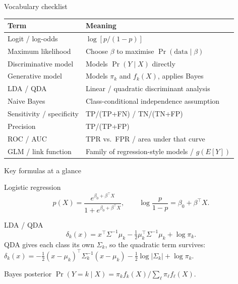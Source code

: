 \documentclass[aspectratio=169,11pt]{beamer}
\begin{document}
\begin{frame}{Vocabulary checklist}
  \footnotesize
  \begin{tabular}{ll}
    \toprule
    \textbf{Term} & \textbf{Meaning} \\
    \midrule
    Logit / log-odds & $\log[p / (1 - p)]$ \\
    Maximum likelihood & Choose $\beta$ to maximise $\Pr(\mathrm{data} \mid \beta)$ \\
    Discriminative model & Models $\Pr(Y \mid X)$ directly \\
    Generative model & Models $\pi_k$ and $f_k(X)$, applies Bayes \\
    LDA / QDA & Linear / quadratic discriminant analysis \\
    Naive Bayes & Class-conditional independence assumption \\
    Sensitivity / specificity & TP/(TP+FN) / TN/(TN+FP) \\
    Precision & TP/(TP+FP) \\
    ROC / AUC & TPR vs.\ FPR / area under that curve \\
    GLM / link function & Family of regression-style models / $g(E[Y])$ \\
    \bottomrule
  \end{tabular}
\end{frame}

\begin{frame}{Key formulas at a glance}
  \begin{block}{Logistic regression}
    \[
      p(X) = \frac{e^{\beta_0 + \beta^\top X}}{1 + e^{\beta_0 + \beta^\top X}},
      \qquad
      \log\frac{p}{1-p} = \beta_0 + \beta^\top X.
    \]
  \end{block}
  \begin{block}{LDA / QDA}
    \[
      \delta_k(x) = x^\top \Sigma^{-1}\mu_k - \tfrac12 \mu_k^\top \Sigma^{-1}\mu_k + \log\pi_k.
    \]
    QDA gives each class its own $\Sigma_k$, so the quadratic term survives:
    $\delta_k(x) = -\tfrac12 (x-\mu_k)^\top \Sigma_k^{-1}(x-\mu_k)
      - \tfrac12\log|\Sigma_k| + \log\pi_k$.
  \end{block}
  \begin{block}{Bayes posterior}
    $\Pr(Y = k \mid X) = \pi_k f_k(X) / \sum_\ell \pi_\ell f_\ell(X)$.
  \end{block}
\end{frame}
\end{document}
